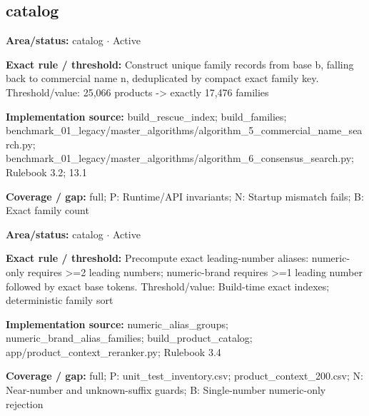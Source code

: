 \subsection*{catalog}
\begin{tcolorbox}[enhanced,breakable,colback=white,colframe=Muted!45,boxrule=0.45pt,arc=1.5pt,left=6pt,right=6pt,top=5pt,bottom=5pt,title={\texttt{CAT-FAMILY-IDENTITY-01}},title after break={\texttt{CAT-FAMILY-IDENTITY-01}\ (continued)},fonttitle=\headingfont\bfseries\color{Navy},coltitle=Navy]
\textbf{Area/status:} catalog $\boldsymbol{\cdot}$ Active\par
\smallskip
\textbf{Exact rule / threshold:} Construct unique family records from base b, falling back to commercial name n, deduplicated by compact exact family key. Threshold/\allowbreak{}value: 25,066 products -> exactly 17,476 families\par
\smallskip
\textbf{Implementation source:} build\_\allowbreak{}rescue\_\allowbreak{}index; build\_\allowbreak{}families; benchmark\_\allowbreak{}01\_\allowbreak{}legacy/\allowbreak{}master\_\allowbreak{}algorithms/\allowbreak{}algorithm\_\allowbreak{}5\_\allowbreak{}commercial\_\allowbreak{}name\_\allowbreak{}search.py; benchmark\_\allowbreak{}01\_\allowbreak{}legacy/\allowbreak{}master\_\allowbreak{}algorithms/\allowbreak{}algorithm\_\allowbreak{}6\_\allowbreak{}consensus\_\allowbreak{}search.py; Rulebook 3.2; 13.1\par
\smallskip
\textbf{Coverage / gap:} full; P: Runtime/\allowbreak{}API invariants; N: Startup mismatch fails; B: Exact family count
\end{tcolorbox}
\begin{tcolorbox}[enhanced,breakable,colback=white,colframe=Muted!45,boxrule=0.45pt,arc=1.5pt,left=6pt,right=6pt,top=5pt,bottom=5pt,title={\texttt{CAT-NUMERIC-ALIASES-04}},title after break={\texttt{CAT-NUMERIC-ALIASES-04}\ (continued)},fonttitle=\headingfont\bfseries\color{Navy},coltitle=Navy]
\textbf{Area/status:} catalog $\boldsymbol{\cdot}$ Active\par
\smallskip
\textbf{Exact rule / threshold:} Precompute exact leading-number aliases: numeric-only requires >=2 leading numbers; numeric-brand requires >=1 leading number followed by exact base tokens. Threshold/\allowbreak{}value: Build-time exact indexes; deterministic family sort\par
\smallskip
\textbf{Implementation source:} numeric\_\allowbreak{}alias\_\allowbreak{}groups; numeric\_\allowbreak{}brand\_\allowbreak{}alias\_\allowbreak{}families; build\_\allowbreak{}product\_\allowbreak{}catalog; app/\allowbreak{}product\_\allowbreak{}context\_\allowbreak{}reranker.py; Rulebook 3.4\par
\smallskip
\textbf{Coverage / gap:} full; P: unit\_\allowbreak{}test\_\allowbreak{}inventory.csv; product\_\allowbreak{}context\_\allowbreak{}200.csv; N: Near-number and unknown-suffix guards; B: Single-number numeric-only rejection
\end{tcolorbox}
